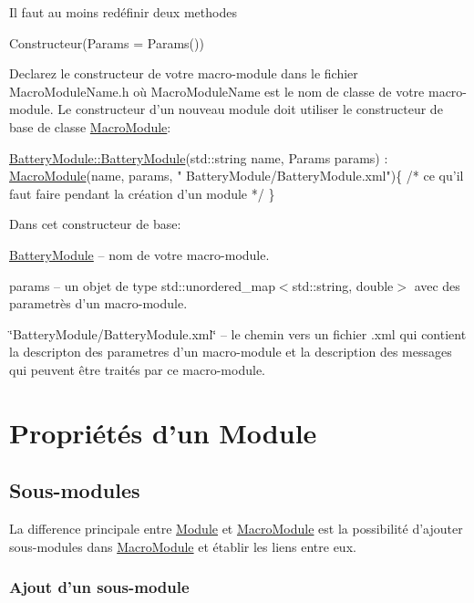 Il faut au moins redéfinir deux methodes
\begin{DoxyItemize}
\item {\ttfamily Constructeur(Params = Params())}

Declarez le constructeur de votre macro-\/module dans le fichier Macro\-Module\-Name.\-h où Macro\-Module\-Name est le nom de classe de votre macro-\/module. Le constructeur d'un nouveau module doit utiliser le constructeur de base de classe \hyperlink{classMacroModule}{Macro\-Module}\-:


\begin{DoxyCode}
\hyperlink{classBatteryModule_a2fb494ef5f124c38c0fdf9ccfb31918f}{BatteryModule::BatteryModule}(std::string name, 
      Params params) : \hyperlink{classMacroModule}{MacroModule}(name, params, \textcolor{stringliteral}{"
      BatteryModule/BatteryModule.xml"})\{
    \textcolor{comment}{/* ce qu'il faut faire pendant la création d'un module */}
\}
\end{DoxyCode}


Dans cet constructeur de base\-:
\begin{DoxyEnumerate}
\item \hyperlink{classBatteryModule}{Battery\-Module} – nom de votre macro-\/module.
\item params – un objet de type {\ttfamily std\-::unordered\-\_\-map$<$std\-::string, double$>$} avec des parametrès d'un macro-\/module.
\item \char`\"{}\-Battery\-Module/\-Battery\-Module.\-xml\char`\"{} – le chemin vers un fichier {\ttfamily .xml} qui contient la descripton des parametres d'un macro-\/module et la description des messages qui peuvent être traités par ce macro-\/module.
\end{DoxyEnumerate}
\end{DoxyItemize}\hypertarget{docModule_properties}{}\section{Propriétés d'un Module}\label{docModule_properties}
\hypertarget{docMacroModule_submodules}{}\subsection{Sous-\/modules}\label{docMacroModule_submodules}
La difference principale entre \hyperlink{classModule}{Module} et \hyperlink{classMacroModule}{Macro\-Module} est la possibilité d'ajouter sous-\/modules dans \hyperlink{classMacroModule}{Macro\-Module} et établir les liens entre eux. \hypertarget{docMacroModule_addsubmodule}{}\subsubsection{Ajout d'un sous-\/module}\label{docMacroModule_addsubmodule}
